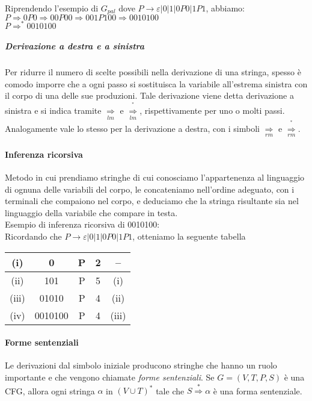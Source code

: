 Riprendendo l'esempio di $G_{pal}$ dove $P\rightarrow\varepsilon|0|1|0P0|1P1$, 
abbiamo:
\\[0.3cm]
$P\Rightarrow 0P0\Rightarrow 00P00 \Rightarrow 001P100 \Rightarrow 0010100$
\\[0.3cm]
$P\Rightarrow ^{\ast} 0010100$

\subparagraph{Derivazione a destra e a sinistra}
Per ridurre il numero di scelte possibili nella derivazione di una stringa, spesso
è comodo imporre che a ogni passo si sostituisca la variabile all'estrema sinistra 
con il corpo di una delle sue produzioni. Tale derivazione viene detta derivazione a 
sinistra e si indica tramite $\underset{lm}{\Rightarrow}$ e 
$\overset{^{\ast}}{\underset{lm}{\Rightarrow}}$, rispettivamente per uno o molti 
passi. Analogamente vale lo stesso per la derivazione a destra, con i simboli
$\underset{rm}{\Rightarrow}$ e 
$\overset{^{\ast}}{\underset{rm}{\Rightarrow}}$.

\paragraph{Inferenza ricorsiva}
Metodo in cui prendiamo stringhe di cui conosciamo l'appartenenza al linguaggio di 
ognuna delle variabili del corpo, le concateniamo nell'ordine adeguato, con i 
terminali che compaiono nel corpo, e deduciamo che la stringa risultante sia nel
linguaggio della variabile che compare in testa.
\\[0.2cm]
Esempio di inferenza ricorsiva di 0010100:
\\[0.1cm]
Ricordando che $P\rightarrow\varepsilon|0|1|0P0|1P1$, otteniamo la seguente tabella

\begin{center}
\begin{tabular}{|c|c|c|c|c|}
\hline 
(i) & 0 & P & 2 & -- \\
\hline
(ii) & 101 & P & 5 & (i) \\
\hline 
(iii) & 01010 & P & 4 & (ii) \\
\hline
(iv) & 0010100 & P & 4 & (iii) \\
\hline
\end{tabular}
\end{center}

\paragraph{Forme sentenziali} Le derivazioni dal simbolo iniziale producono stringhe
che hanno un ruolo importante e che vengono chiamate \textit{forme sentenziali}.
Se $G=(V, T, P, S)$ è una CFG, allora ogni stringa $\alpha$ in $(V\cup T)^{\ast}$
tale che $S\stackrel{\ast}\Rightarrow \alpha$ è una forma sentenziale.





















